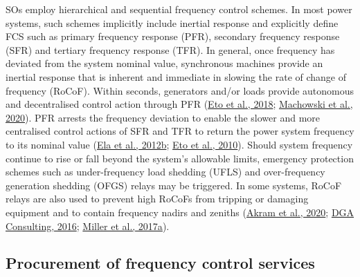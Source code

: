 \documentclass[12pt,a4paper,]{report}
\begin{document}
SOs employ hierarchical and sequential frequency control schemes. In
most power systems, such schemes implicitly include inertial response
and explicitly define FCS such as primary frequency response (PFR),
secondary frequency response (SFR) and tertiary frequency response
(TFR). In general, once frequency has deviated from the system nominal
value, synchronous machines provide an inertial response that is
inherent and immediate in slowing the rate of change of frequency
(RoCoF). Within seconds, generators and/or loads provide autonomous and
decentralised control action through PFR
(\protect\hyperlink{ref-etoFrequencyControlRequirements2018}{Eto et al.,
2018};
\protect\hyperlink{ref-machowskiPowerSystemDynamics2020}{Machowski et
al., 2020}). PFR arrests the frequency deviation to enable the slower
and more centralised control actions of SFR and TFR to return the power
system frequency to its nominal value
(\protect\hyperlink{ref-elaAlternativeApproachesIncentivizing2012}{Ela
et al., 2012b}; \protect\hyperlink{ref-etoUseFrequencyResponse2010}{Eto
et al., 2010}). Should system frequency continue to rise or fall beyond
the system's allowable limits, emergency protection schemes such as
under-frequency load shedding (UFLS) and over-frequency generation
shedding (OFGS) relays may be triggered. In some systems, RoCoF relays
are also used to prevent high RoCoFs from tripping or damaging equipment
and to contain frequency nadirs and zeniths
(\protect\hyperlink{ref-akramEnergyStorageShortTerm2020}{Akram et al.,
2020};
\protect\hyperlink{ref-dgaconsultingInternationalReviewFrequency2016}{DGA
Consulting, 2016};
\protect\hyperlink{ref-millerAdvisoryEquipmentLimits2017}{Miller et al.,
2017a}).

\hypertarget{procurement-of-frequency-control-services}{%
\subsection{Procurement of frequency control
services}\label{procurement-of-frequency-control-services}}
\end{document}
